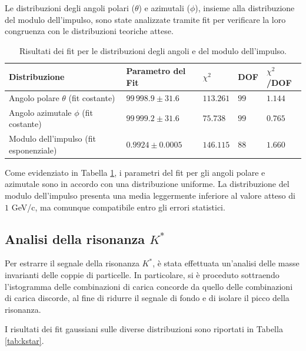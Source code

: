 \documentclass[a4paper,11pt]{article}
\begin{document}
Le distribuzioni degli angoli polari ($\theta$) e azimutali ($\phi$), insieme alla distribuzione del modulo dell'impulso, sono state analizzate tramite fit per verificare la loro congruenza con le distribuzioni teoriche attese.

\begin{table}[h!]
    \centering
    \begin{tabular}{|m{3cm}|>{\centering\arraybackslash}m{3cm}|>{\centering\arraybackslash}m{1.5cm}|>{\centering\arraybackslash}m{1.5cm}|>{\centering\arraybackslash}m{1.5cm}|}
        \hline
        \textbf{Distribuzione} & \textbf{Parametro del Fit} & $\chi^2$ & \textbf{DOF} & $\chi^2$/DOF \\
        \hline
        Angolo polare $\theta$ (fit costante) & $99\,998.9 \pm 31.6$ & $113.261$ & $99$ & $1.144$ \\
        \hline
        Angolo azimutale $\phi$ (fit costante) & $99\,999.2 \pm 31.6$ & $75.738$ & $99$ & $0.765$ \\
        \hline
        Modulo dell'impulso (fit esponenziale) & $0.9924 \pm 0.0005$ & $146.115$ & $88$ & $1.660$ \\
        \hline
    \end{tabular}
    \caption{Risultati dei fit per le distribuzioni degli angoli e del modulo dell'impulso.}
    \label{tab:distribuzioni}
\end{table}

Come evidenziato in Tabella \ref{tab:distribuzioni}, i parametri del fit per gli angoli polare e azimutale sono in accordo con una distribuzione uniforme. La distribuzione del modulo dell'impulso presenta una media leggermente inferiore al valore atteso di $1$ GeV/c, ma comunque compatibile entro gli errori statistici.

\subsection{Analisi della risonanza \( K^* \)}

Per estrarre il segnale della risonanza \( K^* \), è stata effettuata un'analisi delle masse invarianti delle coppie di particelle. In particolare, si è proceduto sottraendo l'istogramma delle combinazioni di carica concorde da quello delle combinazioni di carica discorde, al fine di ridurre il segnale di fondo e di isolare il picco della risonanza.

I risultati dei fit gaussiani sulle diverse distribuzioni sono riportati in Tabella \ref{tab:kstar}.
\end{document}
